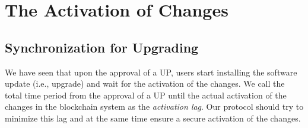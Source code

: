\section{The Activation of Changes}\label{the_activation_of_changes}

\subsection{Synchronization for Upgrading} \label{synchronization_for_upgrading}


We have seen that upon the approval of a UP, users start installing the software update (i.e., upgrade) and wait for the activation of the changes. We call the total  time period from the approval of a UP until the actual activation of the changes in the blockchain system as the \emph{activation lag}. Our protocol should try to minimize this lag and at the same time ensure a secure activation of the changes.


